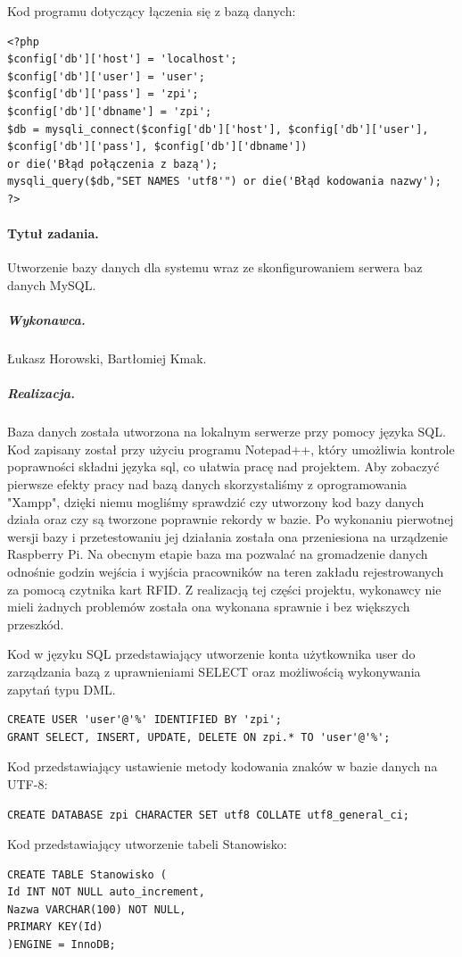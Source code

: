 \documentclass[a4paper]{article}
\begin{document}
Kod programu dotyczący łączenia się z bazą danych:
\begin{verbatim}
<?php
$config['db']['host'] = 'localhost';
$config['db']['user'] = 'user';
$config['db']['pass'] = 'zpi';
$config['db']['dbname'] = 'zpi';
$db = mysqli_connect($config['db']['host'], $config['db']['user'], 
$config['db']['pass'], $config['db']['dbname']) 
or die('Błąd połączenia z bazą');
mysqli_query($db,"SET NAMES 'utf8'") or die('Błąd kodowania nazwy');
?>
\end{verbatim}

\paragraph{Tytuł zadania.} Utworzenie bazy danych dla systemu wraz ze skonfigurowaniem serwera baz danych MySQL.
\subparagraph{Wykonawca.} Łukasz Horowski, Bartłomiej Kmak.
\subparagraph{Realizacja.} Baza danych została utworzona na lokalnym serwerze przy pomocy języka SQL. Kod zapisany został przy użyciu programu Notepad++, który umożliwia kontrole poprawności składni języka sql, co ułatwia pracę nad projektem. Aby zobaczyć pierwsze efekty pracy nad bazą danych skorzystaliśmy z oprogramowania "Xampp", dzięki niemu mogliśmy sprawdzić czy utworzony kod bazy danych działa oraz czy są tworzone poprawnie rekordy w bazie. Po wykonaniu pierwotnej wersji bazy i przetestowaniu jej działania została ona przeniesiona na urządzenie Raspberry Pi. Na obecnym etapie baza ma pozwalać na gromadzenie danych odnośnie godzin wejścia i wyjścia pracowników na teren zakładu rejestrowanych za pomocą czytnika kart RFID. Z realizacją tej części projektu, wykonawcy nie mieli żadnych problemów została ona wykonana sprawnie i bez większych przeszkód.  
 
Kod w języku SQL przedstawiający utworzenie konta użytkownika user do zarządzania bazą z uprawnieniami SELECT oraz możliwością wykonywania zapytań typu DML.
\begin{verbatim}
CREATE USER 'user'@'%' IDENTIFIED BY 'zpi';
GRANT SELECT, INSERT, UPDATE, DELETE ON zpi.* TO 'user'@'%';
\end{verbatim}

Kod przedstawiający ustawienie metody kodowania znaków w bazie danych na UTF-8:
\begin{verbatim}
CREATE DATABASE zpi CHARACTER SET utf8 COLLATE utf8_general_ci;
\end{verbatim}

Kod przedstawiający utworzenie tabeli Stanowisko:
\begin{verbatim}
CREATE TABLE Stanowisko (
Id INT NOT NULL auto_increment,
Nazwa VARCHAR(100) NOT NULL,
PRIMARY KEY(Id)
)ENGINE = InnoDB;
\end{verbatim}
\end{document}
